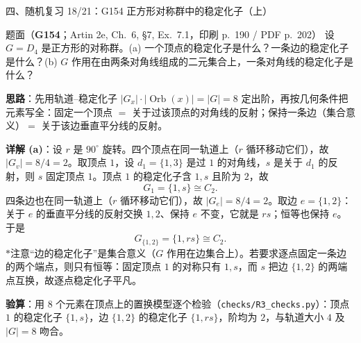 \documentclass[aspectratio=169,10pt,fontset=none]{ctexbeamer}
\newcommand{\ex}[1]{\textcolor{accent}{\footnotesize\bfseries #1}}
\newcommand{\key}[1]{\textcolor{ink}{\bfseries #1}}
\newcommand{\starpt}{\textcolor{accent}{\bfseries$\ast$}}
\begin{document}
\begin{frame}[t]{四、随机复习 18/21：G154 正方形对称群中的稳定化子（上）}
\label{ex:G154}
\scriptsize
\begin{block}{\footnotesize 题面（\ex{G154}；Artin 2e, Ch.~6, \S7, Ex.~7.1，印刷 p.~190 / PDF p.~202）}
设 $G=D_4$ 是正方形的对称群。(a) 一个顶点的稳定化子是什么？一条边的稳定化子是什么？(b) $G$ 作用在由两条对角线组成的二元集合上，一条对角线的稳定化子是什么？
\end{block}
\key{思路}：先用轨道--稳定化子 $|G_x|\cdot|\operatorname{Orb}(x)|=|G|=8$ 定出阶，再按几何条件把元素写全：固定一个顶点 $=$ 关于过该顶点的对角线的反射；保持一条边（集合意义）$=$ 关于该边垂直平分线的反射。

\key{详解 (a)}：设 $r$ 是 $90^\circ$ 旋转。四个顶点在同一轨道上（$r$ 循环移动它们），故 $|G_v|=8/4=2$。取顶点 $1$，设 $d_1=\{1,3\}$ 是过 $1$ 的对角线，$s$ 是关于 $d_1$ 的反射，则 $s$ 固定顶点 $1$。顶点 $1$ 的稳定化子含 $1,s$ 且阶为 $2$，故
\[ G_1=\{1,s\}\cong C_2. \]
四条边也在同一轨道上（$r$ 循环移动它们），故 $|G_e|=8/4=2$。取边 $e=\{1,2\}$：关于 $e$ 的垂直平分线的反射交换 $1,2$、保持 $e$ 不变，它就是 $rs$；恒等也保持 $e$。于是
\[ G_{\{1,2\}}=\{1,rs\}\cong C_2. \]
\starpt{}注意“边的稳定化子”是集合意义（$G$ 作用在边集合上）。若要求逐点固定一条边的两个端点，则只有恒等：固定顶点 $1$ 的对称只有 $1,s$，而 $s$ 把边 $\{1,2\}$ 的两端点互换，故逐点稳定化子平凡。

\key{验算}：用 $8$ 个元素在顶点上的置换模型逐个检验（\texttt{checks/R3\_checks.py}）：顶点 $1$ 的稳定化子 $\{1,s\}$，边 $\{1,2\}$ 的稳定化子 $\{1,rs\}$，阶均为 $2$，与轨道大小 $4$ 及 $|G|=8$ 吻合。
\end{frame}
\end{document}
